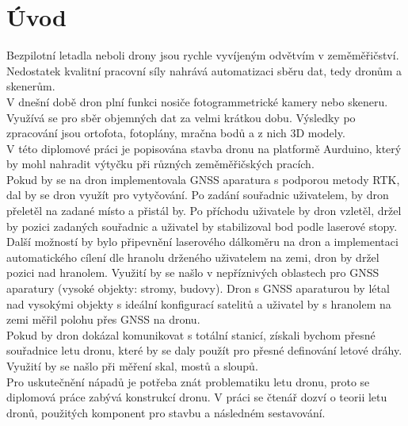 \chapter{Úvod}
\label{0-uvod}


Bezpilotní letadla neboli drony jsou rychle vyvíjeným odvětvím v zeměměřičství. Nedostatek kvalitní pracovní síly nahrává automatizaci sběru dat, tedy dronům a skenerům.\\
V dnešní době dron plní funkci nosiče fotogrammetrické kamery nebo skeneru. Využívá se pro sběr objemných dat za velmi krátkou dobu. Výsledky po zpracování jsou ortofota, fotoplány, mračna bodů a z nich 3D modely.\\
V této diplomové práci je popisována stavba dronu na platformě Aurduino, který by mohl nahradit výtyčku při různých zeměměřičských pracích.\\
Pokud by se na dron implementovala GNSS aparatura s podporou metody RTK, dal by se dron využít pro vytyčování. Po zadání souřadnic uživatelem, by dron přeletěl na zadané místo a přistál by. Po příchodu uživatele by dron vzletěl, držel by pozici zadaných souřadnic a uživatel by stabilizoval bod podle laserové stopy.\\
Další možností by bylo připevnění laserového dálkoměru na dron a implementaci automatického cílení dle hranolu drženého uživatelem na zemi, dron by držel pozici nad hranolem. Využití by se našlo v nepříznivých oblastech pro GNSS aparatury (vysoké objekty: stromy, budovy). Dron s GNSS aparaturou by létal nad vysokými objekty s ideální konfigurací satelitů a uživatel by s hranolem na zemi měřil polohu přes GNSS na dronu.\\
Pokud by dron dokázal komunikovat s totální stanicí, získali bychom přesné souřadnice letu dronu, které by se daly použít pro přesné definování letové dráhy. Využití by se našlo při měření skal, mostů a sloupů.\\
Pro uskutečnění nápadů je potřeba znát problematiku letu dronu, proto se diplomová práce zabývá konstrukcí dronu. V práci se čtenář dozví o teorii letu dronů, použitých komponent pro stavbu a následném sestavování.\\

